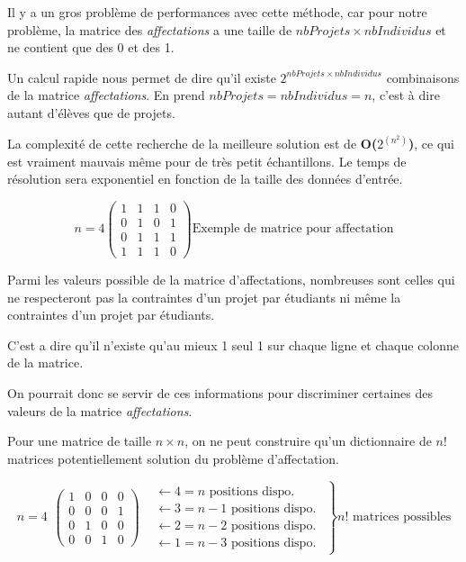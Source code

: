 \documentclass[final,poster]{polytech/polytech}
\begin{document}
Il y a un gros problème de performances avec cette méthode, car pour notre problème, la matrice des \textit{affectations} a une taille de $nbProjets\times nbIndividus$ et ne contient que des 0 et des 1.

Un calcul rapide nous permet de dire qu'il existe $2^{nbProjets\times nbIndividus}$ combinaisons de la matrice \textit{affectations}.
En prend $nbProjets=nbIndividus=n$, c'est à dire autant d'élèves que de projets.

La complexité de cette recherche de la meilleure solution est de \textbf{O($2^{(n^2)}$)}, ce qui est vraiment mauvais même pour de très petit échantillons. Le temps de résolution sera exponentiel en fonction de la taille des données d'entrée.

\begin{equation}
n=4
\left(
\begin{array}{cccc}
1 & 1 & 1 & 0 \\ 
0 & 1 & 0 & 1 \\ 
0 & 1 & 1 & 1 \\ 
1 & 1 & 1 & 0
\end{array} 
\right)
\text{Exemple de matrice pour affectation}
\end{equation}

Parmi les valeurs possible de la matrice d'affectations, nombreuses sont celles qui ne respecteront pas la contraintes d'un projet par étudiants ni même la contraintes d'un projet par étudiants. 

C'est a dire qu'il n'existe qu'au mieux 1 seul 1 sur chaque ligne et chaque colonne de la matrice.

On pourrait donc se servir de ces informations pour discriminer certaines des valeurs de la matrice \textit{affectations}.

Pour une matrice de taille $n\times n$, on ne peut construire qu'un dictionnaire de $n!$ matrices potentiellement solution du problème d'affectation. 

\begin{equation}
\left.
n=4
\begin{array}{cc}
\left(
\begin{array}{cccc}
1 & 0 & 0 & 0 \\ 
0 & 0 & 0 & 1 \\ 
0 & 1 & 0 & 0 \\ 
0 & 0 & 1 & 0
\end{array} 
\right)
&
\begin{array}{l}
\leftarrow 4=n \text{  positions dispo.}\\ 
\leftarrow 3=n-1 \text{  positions dispo.} \\ 
\leftarrow 2=n-2 \text{  positions dispo.}\\ 
\leftarrow 1=n-3 \text{  positions dispo.}
\end{array} 
\end{array}
\right\rbrace
n! \text{ matrices possibles}
\end{equation}
\end{document}
